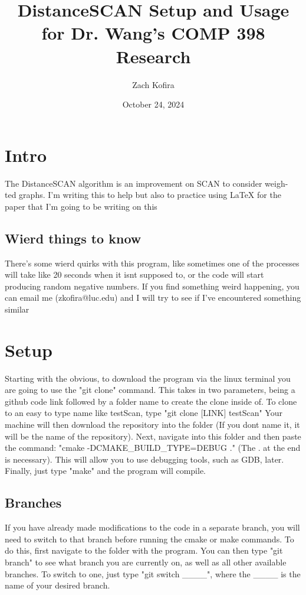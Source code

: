 \documentclass{article}
\title{DistanceSCAN Setup and Usage for Dr. Wang's COMP 398 Research}
\author{Zach Kofira}
\date{October 24, 2024}
\begin{document}
\maketitle

\section{Intro}

The DistanceSCAN algorithm is an improvement on SCAN to consider weigh- ted graphs.  I'm writing this to help but also to practice using LaTeX for the paper that I'm going to be writing on this

\subsection{Wierd things to know}
There's some wierd quirks with this program, like sometimes one of the processes will take like 20 seconds when it isnt supposed to, or the code will start producing random negative numbers.  If you find something weird happening, you can email me (zkofira@luc.edu) and I will try to see if I've encountered something similar

\section{Setup}

Starting with the obvious, to download the program via the linux terminal you are going to use the "git clone" command.  This takes in two parameters, being a github code link followed by a folder name to create the clone inside of.  To clone to an easy to type name like testScan, type "git clone [LINK] testScan"  Your machine will then download the repository into the folder (If you dont name it, it will be the name of the repository).  Next, navigate into this folder and then paste the command: "cmake -DCMAKE\_BUILD\_TYPE=DEBUG ."  (The . at the end is necessary).  This will allow you to use debugging tools, such as GDB, later.  Finally, just type "make" and the program will compile.

\subsection{Branches}

If you have already made modifications to the code in a separate branch,  you will need to switch to that branch before running the cmake or make commands.  To do this, first navigate to the folder with the program.  You can then type "git branch" to see what branch you are currently on, as well as all other available branches.  To switch to one, just type "git switch \_\_\_\_", where the \_\_\_\_ is the name of your desired branch.
\end{document}
